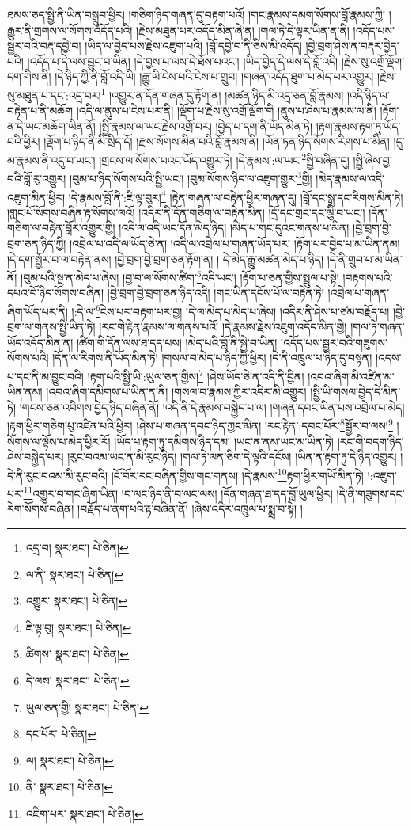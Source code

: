 ཐམས་ཅད་སྤྱི་ནི་ཡིན་བསྒྲུབ་ཕྱིར། །གཅིག་ཉིད་གཞན་དུ་བརྟག་པའོ། །གང་རྣམས་དམག་སོགས་བློ་རྣམས་ཀྱི། །རྒྱུར་ནི་གྲགས་ལ་སོགས་འདོད་པའི། །རྗེས་མཐུན་པར་འདོད་མིན་ཞེ་ན། །གལ་ཏེ་དེ་ལྟར་ཡིན་ན་ནི། །འདོད་པས་སྦྱར་བའི་བརྡ་དབྱེ་བ། །ཡིད་ལ་བྱེད་པས་རྗེས་འཇུག་པའི། །བློ་དབྱེ་བ་ནི་ཅིས་མི་འདོད། །བྱེ་བྲག་ཤེས་ན་བརྡར་བྱེད་པའི། །འདོད་པ་དེ་ལས་བྱུང་བ་ཡིན། །དེ་བྱས་པ་ལས་དེ་ཐོས་པའང་། །ཡིད་བྱེད་དེ་ལས་དེ་བློ་འདི། །རྗེས་སུ་འགྲོ་ལྡོག་དག་གིས་ནི། །དེ་ཉིད་ཀྱི་ནི་བློ་འདི་ཡི། །རྒྱུ་ཡི་ངེས་པའི་ངེས་པ་གྲུབ། །གཞན་འདོད་ཐུག་པ་མེད་པར་འགྱུར། །རྗེས་སུ་མཐུན་པ་དང་:འདྲ་བར།\footnote{འདྲ་བ།  སྣར་ཐང་།  པེ་ཅིན། } །འགྱུར་ན་དོན་གཞན་དུ་རྟོག་ན། །མཚན་ཉིད་མི་འདྲ་ཅན་བློ་རྣམས། །འདི་ཉིད་ལ་བརྟེན་པ་ནི་མཆོག །འདི་ལ་ནུས་པ་ངེས་པར་ནི། །ལྡོག་པ་རྗེས་སུ་འགྲོ་ལྡོག་གི །ནུས་པ་ཤེས་པ་རྣམས་ལ་ནི། །རྟོག་ན་དེ་ཡང་མཆོག་ཡིན་ནོ། །སྤྱི་རྣམས་ལ་ཡང་རྗེས་འགྲོ་བར། །བྱེད་པ་དག་ནི་ཡོད་མིན་ཏེ། །རྟག་རྣམས་རྟག་ཏུ་ཡོད་བའི་ཕྱིར། །ལྡོག་པ་ཉིད་ནི་མི་སྲིད་དོ། །རྫས་སོགས་མིན་པའི་བློ་རྣམས་ནི། །ཡོན་ཏན་ཉིད་སོགས་རིགས་པ་མིན། །དུ་མ་རྣམས་ནི་འདུ་བ་ཡང་། །གྲངས་ལ་སོགས་པའང་ཡོད་འགྱུར་ཏེ། །དེ་རྣམས་:ལ་ཡང་\footnote{ལ་ནི་  སྣར་ཐང་།  པེ་ཅིན། }སྤྱི་བཞིན་དུ། །སྤྱི་ཞེས་བྱ་བའི་བློ་རུ་འགྱུར། །བུམ་པ་ཉིད་སོགས་པའི་སྤྱི་ཡང་། །བུམ་སོགས་ཉིད་ལ་འཇུག་གྱུར་\footnote{འགྱུར་  སྣར་ཐང་།  པེ་ཅིན། }གྱི། །མེད་རྣམས་ལ་འདི་འཇུག་མིན་ཕྱིར། །དེ་རྣམས་བློ་ནི་:ཇི་ལྟ་བུར།\footnote{ཇི་ལྟ་བུ།  སྣར་ཐང་།  པེ་ཅིན། } །རྟེན་གཞན་ལ་བརྟེན་ཕྱིར་གཞན་དུ། །བློ་དང་སྒྲ་དང་རིགས་མིན་ཏེ། །གླང་པོ་སོགས་བཞིན་རྟ་སོགས་ལའོ། །འདིར་ནི་དོན་གཅིག་ལ་བརྟེན་མིན། །དྲོ་དང་གྲང་དང་ལྕི་བ་ཡང་། །དོན་གཅིག་ལ་བརྟེན་བློར་འགྱུར་གྱི། །འདི་ལ་འདི་ཡང་དོན་མེད་ཉིད། །མེད་པ་གང་དུའང་གནས་པ་མིན། །བྱེ་བྲག་བྱེ་བྲག་ཅན་ཉིད་ཀྱི། །འབྲེལ་པ་འདི་ལ་ཡོད་ཅེ་ན། །འདི་ལ་འབྲེལ་པ་གཞན་ཡོད་པར། །རྟོག་པར་བྱེད་པ་མ་ཡིན་ནམ། །དེ་དག་སྦྱོར་བ་ལ་བརྟེན་ནས། །བྱེ་བྲག་བྱེ་བྲག་ཅན་རྟོག་ན། །
དེ་མེད་རྒྱུ་མཚན་མེད་པ་ཉིད། །དེ་ནི་གྲུབ་པ་མ་ཡིན་ནོ། །བུམ་པའི་སྔ་ན་མེད་པ་ཞེས། །བྱ་བ་ལ་སོགས་ཚིག་\footnote{ཚིགས་  སྣར་ཐང་།  པེ་ཅིན། }འདི་ཡང་། །རྟོག་པ་ཅན་གྱིས་སྤྲུལ་པ་སྟེ། །བརྟགས་པའི་དཔའ་བོ་ཉིད་སོགས་བཞིན། །བྱེ་བྲག་བྱེ་བྲག་ཅན་ཉིད་འདི། །གང་ཡིན་དངོས་པོ་ལ་བརྟེན་ཏེ། །འབྲེལ་པ་གཞན་ཞིག་ཡོད་པར་ནི། །:དེ་ལ་\footnote{དེ་ལས་  སྣར་ཐང་།  པེ་ཅིན། }ངེས་པར་བརྟག་པར་བྱ། །དེ་ལ་མེད་པ་མེད་པ་ཞེས། །འདིར་ནི་ཤེས་པ་ཙམ་བརྗོད་པ། །བྱེ་བྲག་ལ་གནས་སྤྱི་ཡིན་ཏེ། །རང་གི་རྟེན་རྣམས་ལ་གནས་པའོ། །དེ་རྣམས་རྗེས་འཇུག་འདོད་མིན་གྱི། །གལ་ཏེ་གཞན་ཡོད་འདོད་མིན་ན། །ཚིག་གི་དོན་ལས་ཐ་དད་པས། །མེད་པའི་བློ་ནི་སྐྱེ་བ་ཡིན། །འདོད་པས་སྦྱར་བའི་གཟུགས་སོགས་པའི། །དོན་ལ་རིགས་ནི་ཡོད་མིན་ཏེ། །གསལ་བ་མེད་པ་ཉིད་ཀྱི་ཕྱིར། །དེ་ནི་འཁྲུལ་པ་ཉིད་དུ་བསྟན། །འདས་པ་དང་ནི་མ་བྱུང་བའི། །རྟག་པའི་སྤྱི་ཡི་:ཡུལ་ཅན་གྱིས།\footnote{ཡུལ་ཅན་གྱི།  སྣར་ཐང་།  པེ་ཅིན། } །ཤེས་ཡོད་ཅེ་ན་འདི་ནི་བྱིན། །འབའ་ཞིག་མི་འཛིན་མ་ཡིན་ནམ། །འབའ་ཞིག་དམིགས་པ་ཡིན་ན་ནི། །གསལ་བ་རྣམས་ཀྱིར་འདིར་མི་འགྱུར། །སྤྱི་ཡི་གསལ་བྱེད་དེ་མིན་ཏེ། །གངས་ཅན་འབིགས་བྱེད་ཉིད་བཞིན་ནོ། །འདི་ནི་དེ་རྣམས་བསྐྱེད་པ་ལ། །གཞན་དབང་ཡིན་པས་འབྲེལ་པ་མེད། །རྟག་ཕྱིར་གཅིག་པུ་འཛིན་པའི་ཕྱིར། །ཤེས་པ་གཞན་དབང་ཉིད་ཀྱང་མིན། །རང་རྟེན་:དབང་པོར་\footnote{དང་པོར་  པེ་ཅིན། }སྦྱོར་བ་ལས།\footnote{ལ།  སྣར་ཐང་།  པེ་ཅིན། } །སོགས་ལ་ལྟོས་པ་མེད་ཕྱིར་རོ། །ཡོད་པ་རྟག་ཏུ་དམིགས་ཉིད་དམ། །ཡང་ན་ནམ་ཡང་མ་ཡིན་ཏེ། །རང་གི་བདག་ཉིད་ཤེས་བསྐྱེད་པར། །རུང་བའམ་ཡང་ན་མི་རུང་ཉིད། །གལ་ཏེ་ལན་ཅིག་དེ་ལྟའི་དངོས། །ཡིན་ན་རྟག་ཏུ་དེ་ཉིད་འགྱུར། །དེ་ནི་རུང་བའམ་མི་རུང་བའི། །ངོ་བོར་རང་བཞིན་གྱིས་གང་གནས། །དེ་རྣམས་\footnote{ནི་  སྣར་ཐང་།  པེ་ཅིན། }རྟག་ཕྱིར་གཡོ་མིན་ཏེ། །:འཇུག་པར་\footnote{འཇིག་པར་  སྣར་ཐང་།  པེ་ཅིན། }འགྱུར་བ་གང་ཞིག་ཡིན། །བ་ལང་ཉིད་ནི་བ་ལང་ལས། །དོན་གཞན་ཐ་དད་བློ་ཡུལ་ཕྱིར། །དེ་ནི་གཟུགས་དང་རེག་སོགས་བཞིན། །བརྗོད་པ་ནག་པའི་རྟ་བཞིན་ནོ། །ཞེས་འདིར་འཁྲུལ་པ་སྨྲ་བ་སྟེ། །
